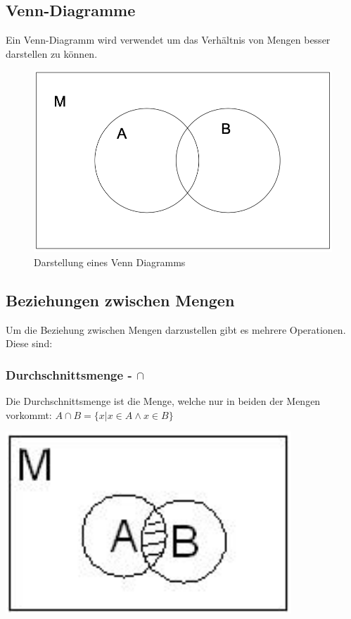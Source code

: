 \documentclass{article}
\begin{document}
	\subsection{Venn-Diagramme}
	Ein Venn-Diagramm wird verwendet um das Verhältnis von Mengen besser darstellen zu können.
	\begin{figure}[H]
	\centering
	\includegraphics[scale=0.3]{Bilder/venn.png}
	\caption{Darstellung eines Venn Diagramms}
	\end{figure}
	\subsection{Beziehungen zwischen Mengen}
	Um die Beziehung zwischen Mengen darzustellen gibt es mehrere Operationen. Diese sind:
	\subsubsection{Durchschnittsmenge - \texorpdfstring{$\cap$}{}}
	Die Durchschnittsmenge ist die Menge, welche nur in beiden der Mengen vorkommt: $A \cap B = \{x|x \in A \land x \in B \}$ \\
	\begin{center}
	\includegraphics[scale=0.5]{Bilder/durchschnitt.png}
	\end{center}
\end{document}

